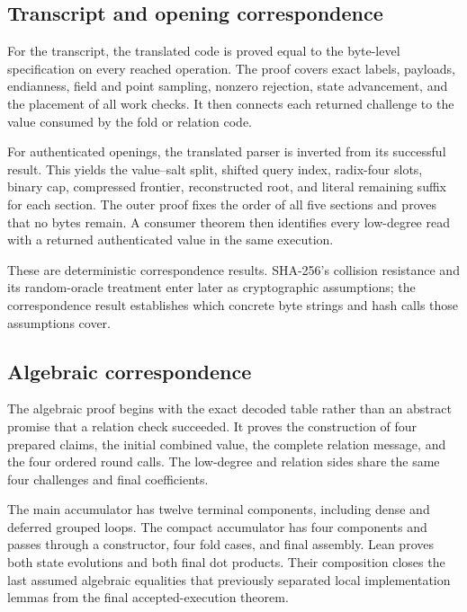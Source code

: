 \subsection{Transcript and opening correspondence}

For the transcript, the translated code is proved equal to the byte-level
specification on every reached operation.  The proof covers exact labels, payloads,
endianness, field and point sampling, nonzero rejection, state advancement,
and the placement of all work checks.  It then connects each returned
challenge to the value consumed by the fold or relation code.

For authenticated openings, the translated parser is inverted from its
successful result.  This yields the value--salt split, shifted query index,
radix-four slots, binary cap, compressed frontier, reconstructed root, and
literal remaining suffix for each section.  The outer proof fixes the order
of all five sections and proves that no bytes remain.  A consumer theorem then
identifies every low-degree read with a returned authenticated value in the
same execution.

These are deterministic correspondence results.  SHA-256's collision
resistance and its random-oracle treatment enter later as cryptographic
assumptions; the correspondence result establishes which concrete byte
strings and hash calls those assumptions cover.

\subsection{Algebraic correspondence}

The algebraic proof begins with the exact decoded table rather than an
abstract promise that a relation check succeeded.  It proves the construction
of four prepared claims, the initial combined value, the complete relation
message, and the four ordered round calls.  The low-degree and relation sides
share the same four challenges and final coefficients.

The main accumulator has twelve terminal components, including dense and
deferred grouped loops.  The compact accumulator has four components and
passes through a constructor, four fold cases, and final assembly.  Lean
proves both state evolutions and both final dot products.  Their composition
closes the last assumed algebraic equalities that previously separated
local implementation lemmas from the final accepted-execution theorem.

